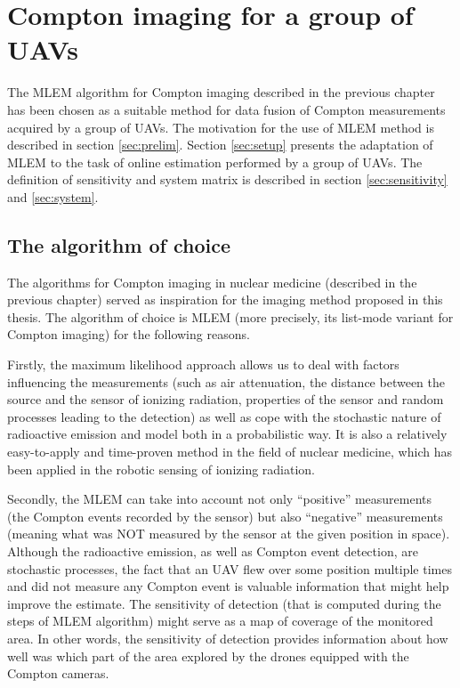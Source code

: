 \chapter{Compton imaging for a group of UAVs\label{chap:methods_estimation}}
The \ac{MLEM} algorithm for Compton imaging described in the previous chapter has been chosen as a suitable method for data fusion of Compton measurements acquired by a group of \ac{UAV}s.
The motivation for the use of \ac{MLEM} method is described in section \autoref{sec:prelim}.
Section \autoref{sec:setup} presents the adaptation of \ac{MLEM} to the task of online estimation performed by a group of \ac{UAV}s.
The definition of sensitivity and system matrix is described in section \autoref{sec:sensitivity} and \autoref{sec:system}.

\section{The algorithm of choice}
\label{sec:prelim}
The algorithms for Compton imaging in nuclear medicine (described in the previous chapter) served as inspiration for the imaging method proposed in this thesis.
The algorithm of choice is \acf{MLEM} (more precisely, its list-mode variant for Compton imaging) for the following reasons.

Firstly, the maximum likelihood approach allows us to deal with factors influencing the measurements (such as air attenuation, the distance between the source and the sensor of ionizing radiation,  properties of the sensor and random processes leading to the detection)
as well as cope with the stochastic nature of radioactive emission and model both in a probabilistic way.
It is also a relatively easy-to-apply and time-proven method in the field of nuclear medicine, which has been applied in the robotic sensing of ionizing radiation.

Secondly, the \ac{MLEM} can take into account not only ``positive'' measurements (the Compton events recorded by the sensor) but also ``negative'' measurements (meaning what was NOT measured by the sensor at the given position in space).
Although the radioactive emission, as well as Compton event detection, are stochastic processes, the fact that an \ac{UAV} flew over some position multiple times and did not measure any Compton event is valuable information that might help improve the estimate.
The sensitivity of detection (that is computed during the steps of \ac{MLEM} algorithm) might serve as a map of coverage of the monitored area.
In other words, the sensitivity of detection provides information about how well was which part of the area explored by the drones equipped with the Compton cameras.

